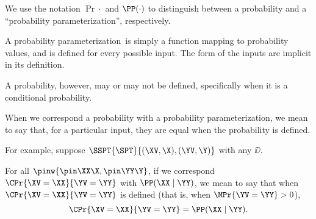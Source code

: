 \begin{note}
  \def\paramprob{probability parameterization}
  We use the notation $\Pr{\cdot}$ and $\PP(\cdot)$ to 
  distinguish between a probability and a ``\paramprob'',
  respectively.

  A \paramprob\ is simply a function mapping 
  to probability values, and is defined for every possible input.
  The form of the inputs are implicit in its definition.

  A probability, however, may or may not be defined, specifically
  when it is a conditional probability.

  When we correspond a probability with a \paramprob,
  we mean to say that, for a particular input, 
  they are equal when the probability is defined.

  For example, suppose $\SSPT{\SPT}{(\XV,\X),(\YV,\Y)}$ with any $\DD$.

  For all $\pinw{\pin\XX\X, \pin\YY\Y}$,
  if we correspond $\CPr{\XV = \XX}{\YV = \YY}$ with $\PP(\XX \mid \YY)$,
  we mean to say that when $\CPr{\XV = \XX}{\YV = \YY}$ is defined (that is, when $\MPr{\YV = \YY} > 0$),
  $$\CPr{\XV = \XX}{\YV = \YY} = \PP(\XX \mid \YY).$$%
\end{note}
